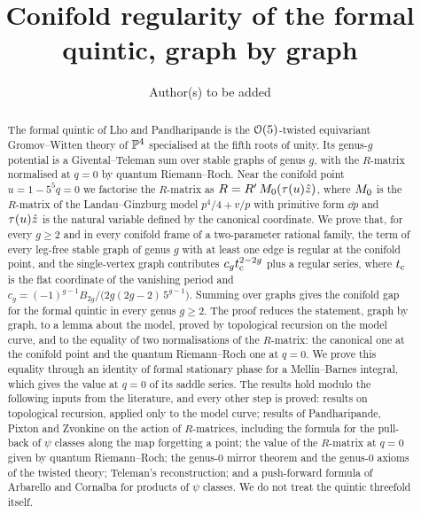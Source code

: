 \documentclass[11pt, reqno]{amsart}
\title[The formal quintic at the conifold point]{Conifold regularity of the formal quintic, graph by graph\protect\draftnote{Working title; to be settled by the authors.}}
\author{Author(s) to be added}
\begin{document}
\begin{abstract}
The formal quintic of Lho and Pandharipande is the $\mathcal{O}(5)$-twisted equivariant Gromov--Witten theory of $\mathbb{P}^4$ specialised at the fifth roots of unity. Its genus-$g$ potential is a Givental--Teleman sum over stable graphs of genus $g$, with the $R$-matrix normalised at $q=0$ by quantum Riemann--Roch. Near the conifold point $u=1-5^5q=0$ we factorise the $R$-matrix as $R=R'\,M_{0}(\tau(u)\hat{z})$, where $M_{0}$ is the $R$-matrix of the Landau--Ginzburg model $p^4/4+v/p$ with primitive form $\dd p$ and $\tau(u)\hat{z}$ is the natural variable defined by the canonical coordinate. We prove that, for every $g\geq 2$ and in every conifold frame of a two-parameter rational family, the term of every leg-free stable graph of genus $g$ with at least one edge is regular at the conifold point, and the single-vertex graph contributes $c_gt_{\mathrm{c}}^{2-2g}$ plus a regular series, where $t_{\mathrm{c}}$ is the flat coordinate of the vanishing period and $c_g=(-1)^{g-1}B_{2g}/\bigl(2g(2g-2)\,5^{g-1}\bigr)$. Summing over graphs gives the conifold gap for the formal quintic in every genus $g\geq2$. The proof reduces the statement, graph by graph, to a lemma about the model, proved by topological recursion on the model curve, and to the equality of two normalisations of the $R$-matrix: the canonical one at the conifold point and the quantum Riemann--Roch one at $q=0$. We prove this equality through an identity of formal stationary phase for a Mellin--Barnes integral, which gives the value at $q=0$ of its saddle series. The results hold modulo the following inputs from the literature, and every other step is proved: results on topological recursion, applied only to the model curve; results of Pandharipande, Pixton and Zvonkine on the action of $R$-matrices, including the formula for the pull-back of $\psi$ classes along the map forgetting a point; the value of the $R$-matrix at $q=0$ given by quantum Riemann--Roch; the genus-$0$ mirror theorem and the genus-$0$ axioms of the twisted theory; Teleman's reconstruction; and a push-forward formula of Arbarello and Cornalba for products of $\psi$ classes. We do not treat the quintic threefold itself.
\end{abstract}

\maketitle

\setcounter{tocdepth}{1}
\tableofcontents












\appendix






\end{document}
